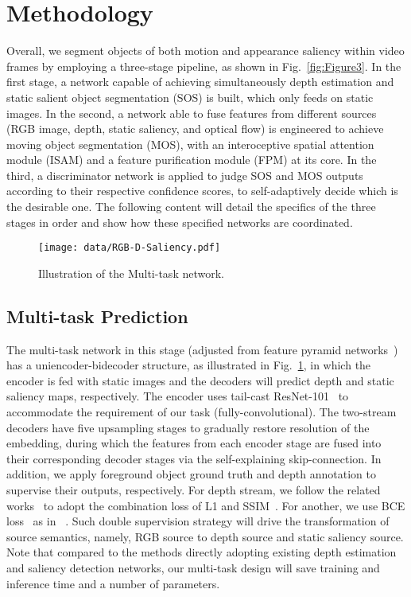 \documentclass[sigconf]{acmart}
\begin{document}
\section{Methodology}
Overall, we segment objects of both motion and appearance saliency within video frames by employing a three-stage pipeline, as shown in Fig.~\ref{fig:Figure3}. In the first stage, a network capable of achieving simultaneously depth estimation and static salient object segmentation (SOS) is built, which only feeds on static images. 
In the second, a network able to fuse features from different sources (RGB image, depth, static saliency, and optical flow) is engineered to achieve moving object segmentation (MOS), with an interoceptive spatial attention module (ISAM) and a feature purification module (FPM) at its core. 
In the third, a discriminator network is applied to judge SOS and MOS outputs according to their respective confidence scores, to self-adaptively decide which is the desirable one. The following content will detail the specifics of the three stages in order and show how these specified networks are coordinated.
\begin{figure}[t]
\texttt{[image: data/RGB-D-Saliency.pdf]}\\
        \centering
        \caption{Illustration of the Multi-task network.}
\label{fig:Figure4}
\vspace{-5mm}
\end{figure} 
\subsection{Multi-task Prediction}\label{sec:RGB-D source}
The multi-task network in this stage (adjusted from feature pyramid networks~\cite{FPN}) has a uniencoder-bidecoder structure, as illustrated in Fig.~\ref{fig:Figure4}, in which the encoder is fed with static images and the decoders will predict depth and static saliency maps, respectively. The encoder uses tail-cast ResNet-101~\cite{Resnet} to accommodate the requirement of our task (fully-convolutional). The two-stream decoders have five upsampling stages
to gradually restore resolution of the embedding, during which the features from each encoder stage are fused into their corresponding decoder stages via the self-explaining skip-connection. In addition, we apply foreground object ground truth and depth annotation to supervise their outputs, respectively. For depth stream, we follow the related works~\cite{depth3,depth4,depth5} to adopt the combination loss of L1 and SSIM~\cite{SSIM}. For another, we use BCE loss~\cite{BCE} as in ~\cite{DSS,Amulet,DGRL,GateNet,MINet}. Such double supervision strategy will drive the transformation of source semantics, namely, RGB source to depth source and static saliency source. Note that compared to the methods directly adopting existing depth estimation and saliency detection networks, our multi-task design will save training and inference time and a number of parameters.
\end{document}
